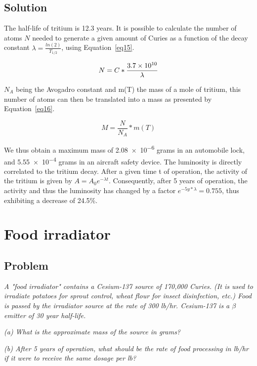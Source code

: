 \subsection{Solution}

The half-life of tritium is 12.3 years. It is possible to calculate the number of atoms $N$ needed to generate a given amount of Curies as a function of the decay constant $\lambda = \frac{ln(2)}{T_{1/2}}$, using Equation~\ref{eq15}.


\begin{equation}\label{eq15}
N = C * \frac{\text{\num{3.7e10}}}{\lambda}
\end{equation}

$N_A$ being the Avogadro constant and m(T) the mass of a mole of tritium, this number of atoms can then be translated into a mass as presented by Equation~\ref{eq16}.


\begin{equation}\label{eq16}
M = \frac{N}{N_A} * m(T)
\end{equation}

We thus obtain a maximum mass of \num{2.08e-6} grams in an automobile lock, and \num{5.55e-4} grams in an aircraft safety device. The luminosity is directly correlated to the tritium decay. After a given time t of operation, the activity of the tritium is given by $A = A_0e^{-\lambda t}$. Consequently, after 5 years of operation, the activity and thus the luminosity has changed by a factor $e^{-5y*\lambda} = 0.755$, thus exhibiting a decrease of 24.5\%.


\section{Food irradiator}
\label{prob15}

\subsection{Problem}

\textit{A "food irradiator" contains a Cesium-137 source of 170,000 Curies. (It is used to irradiate potatoes for sprout control, wheat flour for insect disinfection, etc.) Food is passed by the irradiator source at the rate of 300 lb/hr. Cesium-137 is a $\beta$ emitter of 30 year half-life.}

\textit{(a) What is the approximate mass of the source in grams?}

\textit{(b) After 5 years of operation, what should be the rate of food processing in lb/hr if it were to receive the same dosage per lb?}

